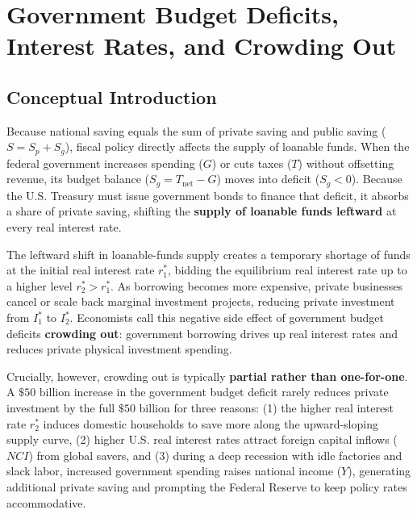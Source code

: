 \documentclass[11pt,letterpaper]{article}
\begin{document}
\section{Government Budget Deficits, Interest Rates, and Crowding Out}

\subsection*{Conceptual Introduction}
Because national saving equals the sum of private saving and public saving ($S = S_p + S_g$), fiscal policy directly affects the supply of loanable funds. When the federal government increases spending ($G$) or cuts taxes ($T$) without offsetting revenue, its budget balance ($S_g = T_{\text{net}} - G$) moves into deficit ($S_g < 0$). Because the U.S. Treasury must issue government bonds to finance that deficit, it absorbs a share of private saving, shifting the \textbf{supply of loanable funds leftward} at every real interest rate.

The leftward shift in loanable-funds supply creates a temporary shortage of funds at the initial real interest rate $r_1^*$, bidding the equilibrium real interest rate up to a higher level $r_2^* > r_1^*$. As borrowing becomes more expensive, private businesses cancel or scale back marginal investment projects, reducing private investment from $I_1^*$ to $I_2^*$. Economists call this negative side effect of government budget deficits \textbf{crowding out}: government borrowing drives up real interest rates and reduces private physical investment spending.

Crucially, however, crowding out is typically \textbf{partial rather than one-for-one}. A $\$50\text{ billion}$ increase in the government budget deficit rarely reduces private investment by the full $\$50\text{ billion}$ for three reasons: (1) the higher real interest rate $r_2^*$ induces domestic households to save more along the upward-sloping supply curve, (2) higher U.S. real interest rates attract foreign capital inflows ($NCI$) from global savers, and (3) during a deep recession with idle factories and slack labor, increased government spending raises national income ($Y$), generating additional private saving and prompting the Federal Reserve to keep policy rates accommodative.
\end{document}
